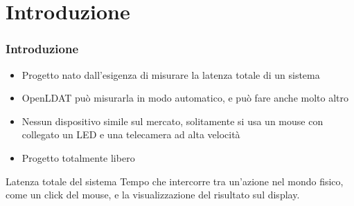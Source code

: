 \documentclass[xcolor={x11names}]{beamer}
\begin{document}
\hoffset=0mm %

\section{Introduzione}%
\begin{frame}
	\frametitle{Introduzione}
	\begin{itemize}
		\item Progetto nato dall'esigenza di \alert{misurare la latenza totale di un sistema}
		\item \alert{OpenLDAT può misurarla in modo automatico}, e può fare anche molto altro
		\item \alert{Nessun dispositivo simile sul mercato}, solitamente si usa un mouse con collegato un LED e una telecamera ad alta velocità
		\item Progetto totalmente \alert{libero}
	\end{itemize}
	\begin{block}{Latenza totale del sistema}
		Tempo che intercorre tra un'azione nel mondo fisico, come un click del mouse, e la visualizzazione del risultato sul display.
	\end{block}
\end{frame}
\end{document}
